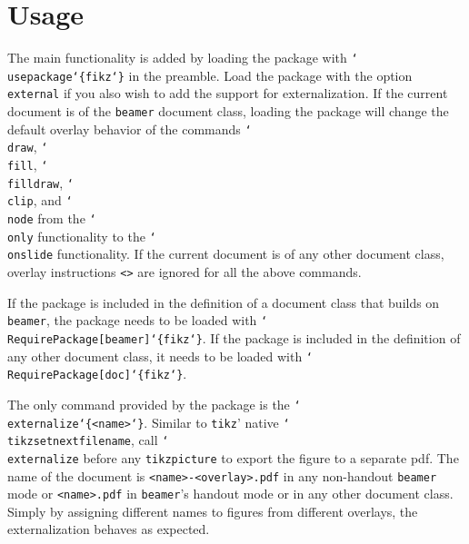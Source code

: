 \documentclass{article}
\renewcommand{\textbackslash}{\char`\\}
\def\leftbrace{\char`\{}
\def\rightbrace{\char`\}}
\def\cmd#1{\texttt{\color{cmd}\textbackslash#1}}
\def\arg#1{{\color{cmd}\leftbrace}{\color{black}#1}{\color{cmd}\rightbrace}}
\def\optarg[#1]{{\color{opt}[#1]}}
\begin{document}
\section{Usage}

The main functionality is added by loading the package with \cmd{usepackage\arg{fikz}} in the preamble. Load the package with the option \texttt{external} if you also wish to add the support for externalization. If the current document is of the \texttt{beamer} document class, loading the package will change the default overlay behavior of the commands \cmd{draw}, \cmd{fill}, \cmd{filldraw}, \cmd{clip}, and \cmd{node} from the \cmd{only} functionality to the \cmd{onslide} functionality. If the current document is of any other document class, overlay instructions \texttt{<>} are ignored for all the above commands.

If the package is included in the definition of a document class that builds on \texttt{beamer}, the package needs to be loaded with \cmd{RequirePackage\optarg[beamer]\arg{fikz}}. If the package is included in the definition of any other document class, it needs to be loaded with \cmd{RequirePackage\optarg[doc]\arg{fikz}}.

The only command provided by the package is the \cmd{externalize\arg{<name>}}. Similar to \texttt{tikz}' native \cmd{tikzsetnextfilename}, call \cmd{externalize} before any \texttt{tikzpicture} to export the figure to a separate pdf. The name of the document is \texttt{<name>-<overlay>.pdf} in any non-handout \texttt{beamer} mode or \texttt{<name>.pdf} in \texttt{beamer}'s handout mode or in any other document class. Simply by assigning different names to figures from different overlays, the externalization behaves as expected. 

\end{document}
